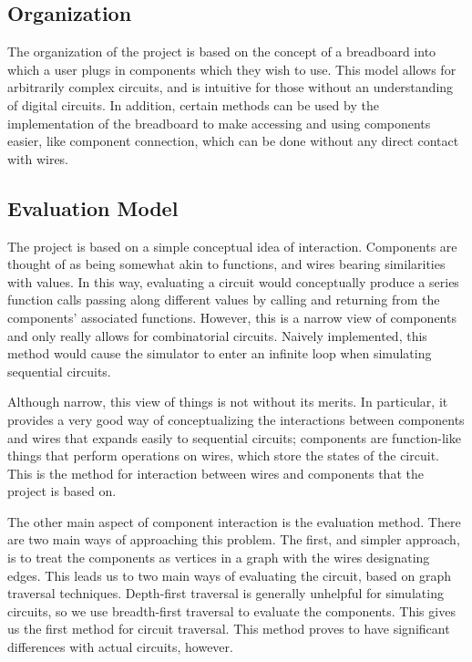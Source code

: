 \documentclass{article}
\begin{document}
\subsection{Organization}

The organization of the project is based on the concept of a breadboard into which a user plugs in components which they wish to use. This model allows for arbitrarily complex circuits, and is intuitive for those without an understanding of digital circuits. In addition, certain methods can be used by the implementation of the breadboard to make accessing and using components easier, like component connection, which can be done without any direct contact with wires.

\subsection{Evaluation Model}

The project is based on a simple conceptual idea of interaction. Components are thought of as being somewhat akin to functions, and wires bearing similarities with values. In this way, evaluating a circuit would conceptually produce a series function calls passing along different values by calling and returning from the components' associated functions. However, this is a narrow view of components and only really allows for combinatorial circuits. Naively implemented, this method would cause the simulator to enter an infinite loop when simulating sequential circuits.

Although narrow, this view of things is not without its merits. In particular, it provides a very good way of conceptualizing the interactions between components and wires that expands easily to sequential circuits; components are function-like things that perform operations on wires, which store the states of the circuit. This is the method for interaction between wires and components that the project is based on.

The other main aspect of component interaction is the evaluation method. There are two main ways of approaching this problem. The first, and simpler approach, is to treat the components as vertices in a graph with the wires designating edges. This leads us to two main ways of evaluating the circuit, based on graph traversal techniques. Depth-first traversal is generally unhelpful for simulating circuits, so we use breadth-first traversal to evaluate the components. This gives us the first method for circuit traversal. This method proves to have significant differences with actual circuits, however.
\end{document}
